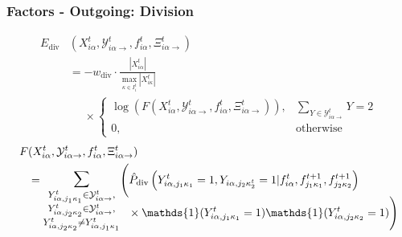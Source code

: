 \begin{frame}[plain]
    \frametitle{Factors - Outgoing: Division}
    \begin{align*}
        E_{\mathrm{div}}&(X_{i\alpha}^t, \mathcal{Y}_{i\alpha\rightarrow}^{t}, f_{i\alpha}^t,
        \Xi_{i\alpha\rightarrow}^{t}) \\ \nonumber
        &=-w_{\mathrm{div}} \cdot \frac{|X_{i\alpha}^t|} {\max_{\kappa \in I_i^t}|X_{i\kappa}^t|} \\ \nonumber
        &\phantom{=}\times
        \begin{cases}
            \log (F(X_{i\alpha}^t, \mathcal{Y}_{i\alpha\rightarrow}^{t}, f_{i\alpha}^t,
            \Xi_{i\alpha\rightarrow}^{t})), & \sum_{Y\in\mathcal{Y}_{i\alpha\rightarrow}^{t}}Y=2 \\
            0, &\text{otherwise}
        \end{cases}
    \end{align*}
    \begin{alignat}{3}
        \nonumber
        F&(X_{i\alpha}^t, \mathcal{Y}_{i\alpha\rightarrow}^{t}, f_{i\alpha}^t,
        \Xi_{i\alpha\rightarrow}^{t}) \\ \nonumber
        &=\mathlarger{\mathlarger{\sum}}_{\mathsmaller{\substack{Y_{i\alpha,j_1\kappa_1}^t \in
                    \mathcal{Y}_{i\alpha\rightarrow}^{t}, \\ \nonumber
                    Y_{i\alpha,j_2\kappa_2}^t \in \mathcal{Y}_{i\alpha\rightarrow}^{t},\\ \nonumber
                    Y_{i\alpha,j_2\kappa_2}^t \ne Y_{i\alpha,j_1\kappa_1}^t}}}
        \Bigg(\hat{P}_{\mathrm{div}}\left(Y_{i\alpha,j_1\kappa_1}^t=1,Y_{i\alpha,j_2\kappa_2^t}=1|f_{i\alpha}^t,f_{j_1\kappa_1}^{t+1},f_{j_2\kappa_2}^{t+1}\right)
        \\[-35pt] \nonumber
        &\phantom{=}\quad\quad\quad\quad\quad\quad\quad\;\;\;\;\times\mathds{1}(Y_{i\alpha,j_1\kappa_1}^t=1)\mathds{1}(Y_{i\alpha,j_2\kappa_2}^t=1)\Bigg)
    \end{alignat}
\end{frame}


